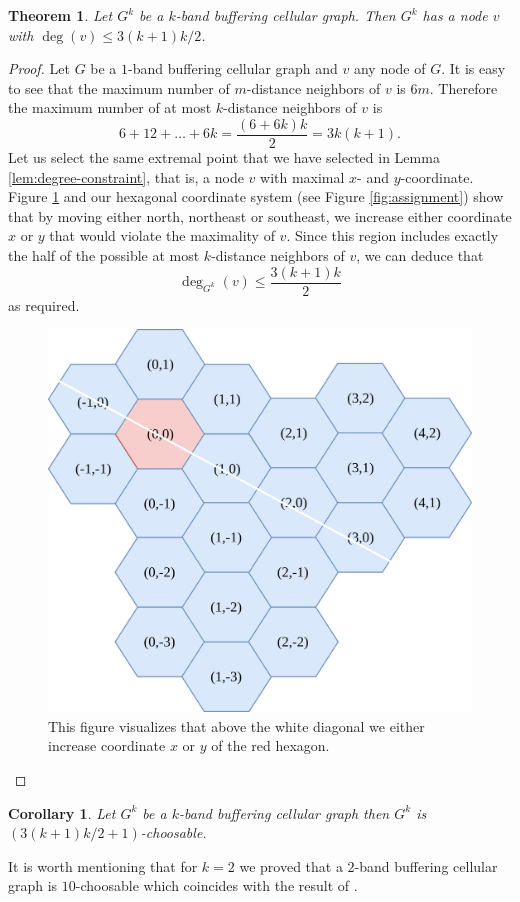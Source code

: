 \documentclass[a4paper, 12pt]{article}
\newtheorem{theo}[lem]{Theorem}
\newtheorem{corollary}[lem]{Corollary}
\begin{document}
\begin{theo} Let $G^k$ be a $k$-band buffering cellular graph. Then $G^k$ has a node $v$ with $\deg(v) \leqslant 3(k+1)k/2$.
\end{theo}
\begin{proof} Let $G$ be a $1$-band buffering cellular graph and $v$ any node of $G$. It is easy to see that the maximum number of $m$-distance neighbors of $v$ is $6m$. Therefore the maximum number of at most $k$-distance neighbors of $v$ is 
$$6+12+\ldots+6k=\frac{(6 + 6k)k}{2} = 3k(k+1).$$
Let us select the same extremal point that we have selected in Lemma \ref{lem:degree-constraint}, that is, a node $v$ with maximal $x$- and $y$-coordinate. Figure \ref{fig:extremal-proof} and our hexagonal coordinate system (see Figure \ref{fig:assignment}) show that by moving either north, northeast or southeast, we increase either coordinate $x$ or $y$ that would violate the maximality of $v$. Since this region includes exactly the half of the possible at most $k$-distance neighbors of $v$, we can deduce that
$$\deg_{G^k}(v) \leqslant \frac{3(k+1)k}{2}$$ 
as required.
\begin{figure}[!h]
\centering
\includegraphics[scale=0.09]{figures/proof-k-band-buffering.png}
\caption{This figure visualizes that above the white diagonal we either increase coordinate $x$ or $y$ of the red hexagon.}\label{fig:extremal-proof}
\end{figure}
\end{proof}
\begin{corollary}\label{cor:main-result} Let $G^k$ be a $k$-band buffering cellular graph then $G^k$ is $(3(k+1)k/2+1)$-choosable.
\end{corollary}
It is worth mentioning that for $k=2$ we proved that a $2$-band buffering cellular graph is $10$-choosable which coincides with the result of \cite{7248845}. 
\end{document}
